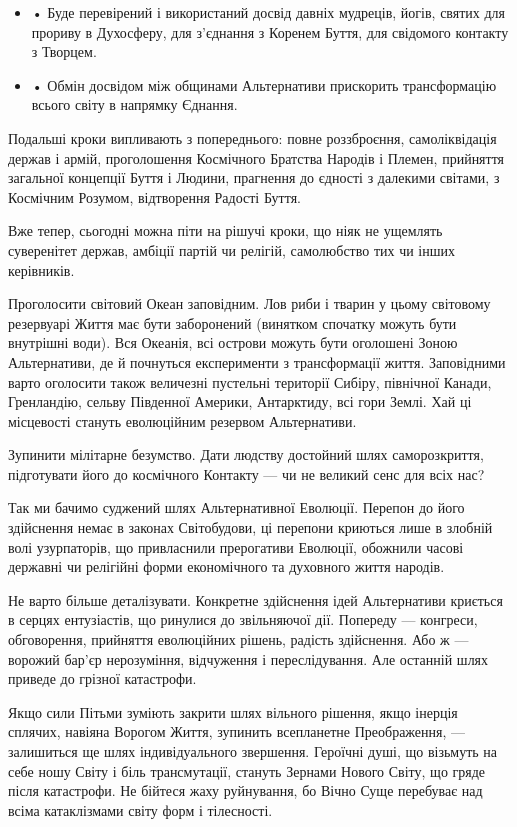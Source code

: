 \begin{itemize}
\item • Буде перевірений і використаний досвід давніх мудреців, йогів, святих для
прориву в Духосферу, для з’єднання з Коренем Буття, для
свідомого контакту з Творцем.

\item • Обмін досвідом між общинами Альтернативи прискорить трансформацію
всього світу в напрямку Єднання.

\end{itemize}

Подальші кроки випливають з попереднього: повне роззброєння, самоліквідація
держав і армій, проголошення Космічного Братства Народів і Племен, прийняття
загальної концепції Буття і Людини, прагнення до єдності з далекими світами, з
Космічним Розумом, відтворення Радості Буття.

Вже тепер, сьогодні можна піти на рішучі кроки, що ніяк не ущемлять суверенітет
держав, амбіції партій чи релігій, самолюбство тих чи інших керівників.

Проголосити світовий Океан заповідним. Лов риби і тварин у цьому світовому
резервуарі Життя має бути заборонений (винятком спочатку можуть бути внутрішні
води). Вся Океанія, всі острови можуть бути оголошені Зоною Альтернативи, де й
почнуться експерименти з трансформації життя. Заповідними варто оголосити також
величезні пустельні території Сибіру, північної Канади, Гренландію, сельву
Південної Америки, Антарктиду, всі гори Землі. Хай ці місцевості стануть
еволюційним резервом Альтернативи.

Зупинити мілітарне безумство. Дати людству достойний шлях саморозкриття,
підготувати його до космічного Контакту — чи не великий сенс для всіх нас?

Так ми бачимо суджений шлях Альтернативної Еволюції. Перепон до його здійснення
немає в законах Світобудови, ці перепони криються лише в злобній волі
узурпаторів, що привласнили прерогативи Еволюції, обожнили часові державні чи
релігійні форми економічного та духовного життя народів.

Не варто більше деталізувати. Конкретне здійснення ідей Альтернативи криється в
серцях ентузіастів, що ринулися до звільняючої дії. Попереду — конгреси,
обговорення, прийняття еволюційних рішень, радість здійснення. Або ж — ворожий
бар’єр нерозуміння, відчуження і переслідування. Але останній шлях приведе до
грізної катастрофи.

Якщо сили Пітьми зуміють закрити шлях вільного рішення, якщо інерція сплячих,
навіяна Ворогом Життя, зупинить всепланетне Преображення, — залишиться ще шлях
індивідуального звершення. Героїчні душі, що візьмуть на себе ношу Світу і біль
трансмутації, стануть Зернами Нового Світу, що гряде після катастрофи. Не
бійтеся жаху руйнування, бо Вічно Суще перебуває над всіма катаклізмами світу
форм і тілесності.

